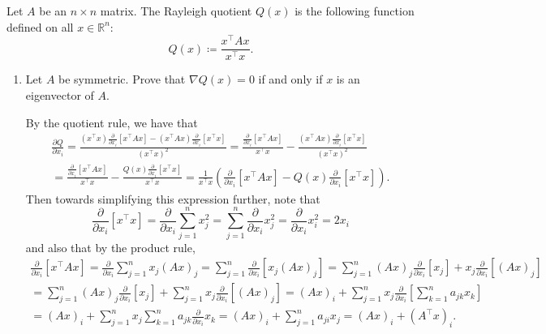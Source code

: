 \documentclass{../../../kin_math}
\begin{document}
\begin{questions}
  \question Let $A$ be an $n \times n$ matrix. The Rayleigh quotient $Q(x)$ is the following function defined on all $x \in \mathbb{R}^n$:
  \begin{equation*}
    Q(x) \coloneqq \frac{x^\top Ax}{x^\top x}.
  \end{equation*}
  \begin{enumerate}
    \item Let $A$ be symmetric. Prove that $\nabla Q(x) = 0$ if and only if $x$ is an eigenvector of $A$.
    \begin{solution}
      By the quotient rule, we have that
      \begin{multline*}
        \frac{\partial Q}{\partial x_i} = \frac{(x^\top x) \frac{\partial}{\partial x_i} [x^\top A x] - (x^\top A x) \frac{\partial}{\partial x_i} [x^\top x]}{(x^\top x)^2} = \frac{\frac{\partial}{\partial x_i} [x^\top A x]}{x^\top x} - \frac{(x^\top A x) \frac{\partial}{\partial x_i} [x^\top x]}{(x^\top x)^2} \\
        = \frac{\frac{\partial}{\partial x_i} [x^\top A x]}{x^\top x} - \frac{Q(x) \frac{\partial}{\partial x_i} [x^\top x]}{x^\top x} = \frac{1}{x^\top x} \left(\frac{\partial}{\partial x_i}[x^\top A x] - Q(x) \frac{\partial}{\partial x_i}[x^\top x]\right).
      \end{multline*}
      Then towards simplifying this expression further, note that
      \begin{equation*}
        \frac{\partial}{\partial x_i}[x^\top x] = \frac{\partial}{\partial x_i} \sum_{j = 1}^n x_j^2 = \sum_{j = 1}^n \frac{\partial}{\partial x_i} x_j^2 = \frac{\partial}{\partial x_i} x_i^2 = 2x_i
      \end{equation*}
      and also that by the product rule,
      \begin{multline*}
        \frac{\partial}{\partial x_i}[x^\top A x] = \frac{\partial}{\partial x_i} \sum_{j = 1}^n x_j (Ax)_j = \sum_{j = 1}^n \frac{\partial}{\partial x_i} [x_j (Ax)_j] = \sum_{j = 1}^n (Ax)_j \frac{\partial}{\partial x_i} [x_j] + x_j \frac{\partial}{\partial x_i} [(Ax)_j] \\
        = \sum_{j = 1}^n (Ax)_j \frac{\partial}{\partial x_i} [x_j] + \sum_{j = 1}^n x_j \frac{\partial}{\partial x_i} [(Ax)_j] = (Ax)_i + \sum_{j = 1}^n x_j \frac{\partial}{\partial x_i} \left[\sum_{k = 1}^n a_{jk} x_k \right] \\
        = (Ax)_i + \sum_{j = 1}^n x_j \sum_{k = 1}^n a_{jk} \frac{\partial}{\partial x_i} x_k = (Ax)_i + \sum_{j = 1}^n a_{ji} x_j = (Ax)_i + (A^\top x)_i.
      \end{multline*}

\end{solution}
\end{enumerate}
\end{questions}
\end{document}
